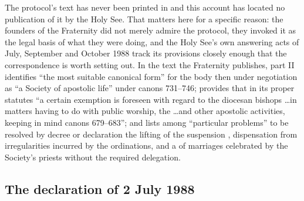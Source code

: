 The protocol's text has never been printed in  and this account has located no publication of it by the Holy
See. That matters here for a specific reason: the founders of the
Fraternity did not merely admire the protocol, they invoked it as the
legal basis of what they were doing, and the Holy See's own answering
acts of July, September and October 1988 track its provisions closely
enough that the correspondence is worth setting out. In the text the
Fraternity publishes, part II identifies ``the most suitable canonical
form'' for the body then under negotiation as ``a Society of apostolic
life'' under canons 731--746; provides that in its proper statutes ``a
certain exemption is foreseen with regard to the diocesan bishops
\ldots in matters having to do with public worship, the  \ldots and other apostolic activities, keeping in mind canons
679--683''; and lists among ``particular problems'' to be resolved by
decree or declaration the lifting of the suspension ,
dispensation from irregularities incurred by the ordinations, and a
 of marriages celebrated by the Society's
priests without the required delegation.

\subsection{The declaration of 2 July 1988}


